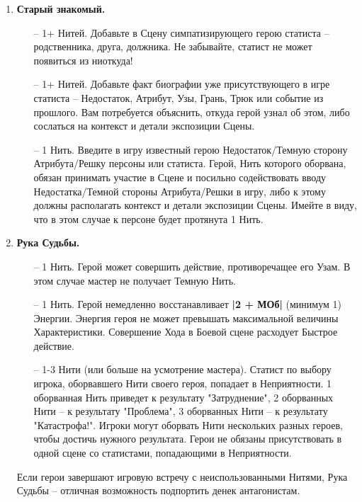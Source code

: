 \begin{enumerate}
    \item \textbf{Старый знакомый.}
    \begin{itemize}
        \item[--] 1+ Нитей. Добавьте в Сцену симпатизирующего герою статиста – родственника, друга, должника. Не забывайте, статист не может появиться из ниоткуда!
        \item[--] 1+ Нитей. Добавьте факт биографии уже присутствующего в игре статиста – Недостаток, Атрибут, Узы, Грань, Трюк или событие из прошлого. Вам потребуется объяснить, откуда герой узнал об этом, либо сослаться на контекст и детали экспозиции Сцены.
        \item[--] 1 Нить. Введите в игру известный герою Недостаток/Темную сторону Атрибута/Решку персоны или статиста. Герой, Нить которого оборвана, обязан принимать участие в Сцене и посильно содействовать вводу Недостатка/Темной стороны Атрибута/Решки в игру, либо к этому должны располагать контекст и детали экспозиции Сцены.
        \newline Имейте в виду, что в этом случае к персоне будет протянута 1 Нить.
    \end{itemize}

    \item \textbf{Рука Судьбы.}
	\begin{itemize}
        \item[--] 1 Нить. Герой может совершить действие, противоречащее его Узам. В этом случае мастер не получает Темную Нить.
        \item[--] 1 Нить. Герой немедленно восстанавливает \textbf{|2 + МОб|} (минимум 1) Энергии. Энергия героя не может превышать максимальной величины Характеристики. Совершение Хода в Боевой сцене расходует Быстрое действие.
        \item[--] 1-3 Нити (или больше на усмотрение мастера). Статист по выбору игрока, оборвавшего Нити своего героя, попадает в Неприятности. 1 оборванная Нить приведет к результату "Затруднение", 2 оборванных Нити – к результату "Проблема", 3 оборванных Нити – к результату "Катастрофа!". Игроки могут оборвать Нити нескольких разных героев, чтобы достичь нужного результата. Герои не обязаны присутствовать в одной сцене со статистами, попадающими в Неприятности.
    \end{itemize}
    \begin{tcolorbox}
        Если герои завершают игровую встречу с неиспользованными Нитями, Рука Судьбы – отличная возможность подпортить денек антагонистам.
    \end{tcolorbox}


\end{enumerate}
